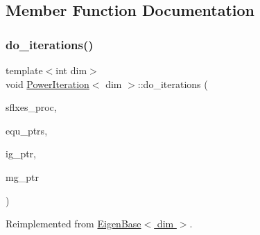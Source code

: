 \subsection{Member Function Documentation}
\mbox{\label{class_power_iteration_a7a87263df0f1ca9e01f2647cd91461ed}} 
\subsubsection{\texorpdfstring{do\+\_\+iterations()}{do\_iterations()}}
{\footnotesize\ttfamily template$<$int dim$>$ \\
void \hyperlink{class_power_iteration}{Power\+Iteration}$<$ dim $>$\+::do\+\_\+iterations (\begin{DoxyParamCaption}\item[{std\+::vector$<$ Vector$<$ double $>$ $>$ \&}]{sflxes\+\_\+proc,  }\item[{std\+::vector$<$ std\+\_\+cxx11\+::shared\+\_\+ptr$<$ \hyperlink{class_equation_base}{Equation\+Base}$<$ dim $>$ $>$ $>$ \&}]{equ\+\_\+ptrs,  }\item[{std\+\_\+cxx11\+::shared\+\_\+ptr$<$ \hyperlink{class_i_g_base}{I\+G\+Base}$<$ dim $>$ $>$}]{ig\+\_\+ptr,  }\item[{std\+\_\+cxx11\+::shared\+\_\+ptr$<$ \hyperlink{class_m_g_base}{M\+G\+Base}$<$ dim $>$ $>$}]{mg\+\_\+ptr }\end{DoxyParamCaption})\hspace{0.3cm}{\ttfamily [virtual]}}



Reimplemented from \hyperlink{class_eigen_base_a8a9ef8878e5b7199aa662f2b61b2d864}{Eigen\+Base$<$ dim $>$}.

\mbox{\label{class_power_iteration_a583586002126f8b7a523e95327047cba}} 
